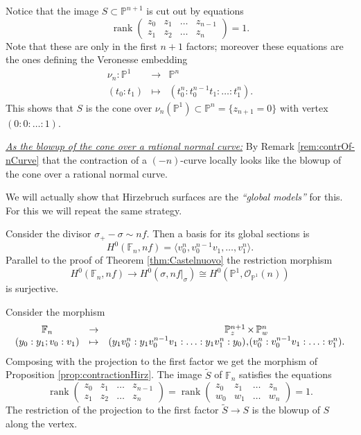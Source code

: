 \documentclass[a4paper,11pt]{amsart}
\def\rank{\operatorname{rank}}
\newcommand{\OO}{\mathcal{O}}
\newcommand{\PP}{\mathbb{P}}
\renewcommand{\FF}{\mathbb{F}}
\newcommand{\isom}{\cong}
\begin{document}
Notice that the image $S\subset \PP^{n+1}$ is cut out by equations 
\[
\rank
\left(
\begin{array}{cccc}
	z_0 & z_1 & \dots & z_{n-1}\\
	z_1 & z_2 & \dots & z_n
\end{array}
\right) = 1.
\]
Note that these are only in the first $n+1$ factors;
moreover these equations are the ones defining the Veronesse embedding
\[
\begin{array}{ccc}
	\nu_n\colon \PP^1 & \to & \PP^{n}\\
	(t_0:t_1) & \mapsto & (t_0^n:t_0^{n-1}t_1:\ldots:t_1^n).
\end{array}
\]
This shows that $S$ is the cone over $\nu_n(\PP^1) \subset \PP^n = \{z_{n+1} = 0\}$ with vertex $(0:0:\ldots :1)$.

\vspace{.3cm}

\noindent\underline{\emph{As the blowup of the cone over a rational normal curve:}}\label{sec:FFnAsBlowupsOfCone}
By Remark \ref{rem:contrOf-nCurve} that the contraction of a $(-n)$-curve locally looks like the blowup of the cone over a rational normal curve.

We will actually show that Hirzebruch surfaces are the \emph{``global models''} for this.
For this we will repeat the same strategy.

Consider the divisor $\sigma_+ - \sigma \sim nf$.
Then a basis for its global sections is
\[
H^0(\FF_n,nf) = \langle v_0^n, v_0^{n-1}v_1, \dots, v_1^n \rangle.
\]
Parallel to the proof of Theorem \ref{thm:Castelnuovo} the restriction morphism
\[
H^0(\FF_n, nf) \to H^0(\sigma,nf|_{\sigma}) \isom H^0(\PP^1,\OO_{\PP^1}(n))
\]
is surjective.

Consider the morphism
\[
\begin{array}{ccrcl}
	\FF_n & \to & \PP_z^{n+1} &\hspace{-.3cm} \times &\hspace{-.3cm} \PP_w^{n}\\
	(y_0:y_1;v_0:v_1) & \mapsto & (y_1v_0^n: y_1v_0^{n-1}v_1 :\ldots: y_1v_1^n: y_0)  &\hspace{-.55cm},& \hspace{-.55cm}(v_0^n: v_0^{n-1}v_1: \ldots: v_1^n).
\end{array}
\]
Composing with the projection to the first factor we get the morphism of Proposition \ref{prop:contractionHirz}.
The image $\tilde{S}$ of $\FF_n$ satisfies the equations
\[
\rank
\left(
\begin{array}{cccc}
	z_0 & z_1 & \dots & z_{n-1}\\
	z_1 & z_2 & \dots & z_n
\end{array}
\right) =
\rank
\left(
\begin{array}{cccc}
	z_0 & z_1 & \dots & z_n\\
	w_0 & w_1 & \dots & w_n
\end{array}
\right) = 1.
\]
The restriction of the projection to the first factor $\tilde{S} \to S$ is the blowup of $S$ along the vertex.
\end{document}
